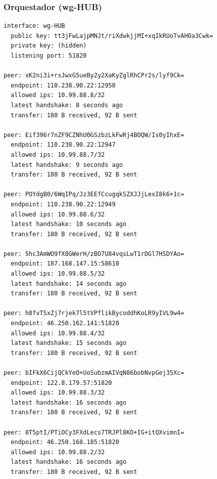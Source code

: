 \documentclass[11pt,a4paper]{article}
\begin{document}
\subsubsection*{Orquestador (wg-HUB)}
\begin{lstlisting}
interface: wg-HUB
  public key: tt3jFwLajpMNJt/riXdwkjjMI+xqIkRUoTvAHOa3Cwk=
  private key: (hidden)
  listening port: 51820

peer: xK2ni3i+rsJwxG5ueBy2y2XaKyZglRhCPr2s/lyf9Ck=
  endpoint: 110.238.90.22:12950
  allowed ips: 10.99.88.8/32
  latest handshake: 8 seconds ago
  transfer: 180 B received, 92 B sent

peer: Eif396r7nZF9CZNhU0GSzbzLkFwRj4BOQW/Is0yIhxE=
  endpoint: 110.238.90.22:12947
  allowed ips: 10.99.88.7/32
  latest handshake: 9 seconds ago
  transfer: 180 B received, 92 B sent

peer: POYdgB0/6WqIPq/Jz3EEfCcugqkSZXJJjLexI8k6+1c=
  endpoint: 110.238.90.22:12949
  allowed ips: 10.99.88.6/32
  latest handshake: 10 seconds ago
  transfer: 180 B received, 92 B sent

peer: 5hc3AmWO9fX8GWerH/zBO7U84vqsLwT1rDGl7HSDYAo=
  endpoint: 187.168.147.15:58610
  allowed ips: 10.99.88.5/32
  latest handshake: 14 seconds ago
  transfer: 180 B received, 92 B sent

peer: h8fvTSxZj7rjek7l5tVPflikBycoddhKoLR9yIVL9w4=
  endpoint: 46.250.162.141:51820
  allowed ips: 10.99.88.4/32
  latest handshake: 15 seconds ago
  transfer: 180 B received, 92 B sent

peer: bIFkX6CijQCkYeO+UoSubzmAIVqN86bobNvpGej35Xc=
  endpoint: 122.8.179.57:51820
  allowed ips: 10.99.88.3/32
  latest handshake: 16 seconds ago
  transfer: 180 B received, 92 B sent

peer: 8T5ptI/PTiOCy3FXdLecs7TRJPl8KO+IG+itQXvimnI=
  endpoint: 46.250.168.185:51820
  allowed ips: 10.99.88.2/32
  latest handshake: 16 seconds ago
  transfer: 180 B received, 92 B sent

\end{lstlisting}
\end{document}
